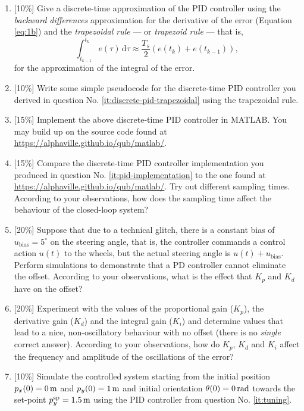 \documentclass[a4paper,10pt,reqno]{amsart}
\numberwithin{equation}{section}
\theoremstyle{plain}
\begin{document}
      \begin{enumerate}
	\item {} \label{it:discrete-pid-trapezoidal}
	      {}[10\%]{} Give a discrete-time approximation of the PID controller using the 
	      \textit{backward differences} approximation for the derivative of the error (Equation \eqref{eq:1b})
	      and the \textit{trapezoidal rule} --- or \textit{trapezoid rule} --- that is, 
	      \[
	      \int_{t_{k-1}}^{t_k} e(\tau)\, {}\mathrm{d}\tau 
	      {}\approx{} 
	      \frac{T_s}{2} \left(e(t_k) + e(t_{k-1})\right),\tag{2}
	      \]
	      for the approximation of the integral of the error.
	\item {}[10\%]{} Write some simple pseudocode for the discrete-time PID controller
	      you derived in question No. \ref{it:discrete-pid-trapezoidal} using the 
	      trapezoidal rule.
	\item {}\label{it:pid-implementation} {}[15\%]{} Implement the above discrete-time PID controller 
	      in MATLAB. You may build up on the source 
	      code found at \href{https://alphaville.github.io/qub/matlab/}{https://alphaville.github.io/qub/matlab/}{.}
	\item {}[15\%]{} Compare the discrete-time PID controller implementation you 
	      produced in question No. \ref{it:pid-implementation}
	      to the one found at \href{https://alphaville.github.io/qub/matlab/}%
	      {https://alphaville.github.io/qub/matlab/}{.}
	      Try out different sampling times.	According to your observations, how does the sampling time
	      affect the behaviour of the closed-loop system?
	\item {}[20\%]{} Suppose that due to a technical glitch, there is a constant bias of $u_{\mathrm{bias}} = 5^\circ$
	      on the steering angle, that is, the controller commands a control action $u(t)$ to the 
	      wheels, but the actual steering angle is $u(t) + u_{\mathrm{bias}}$.
	      Perform simulations to demonstrate that a PD controller cannot eliminate the offset.
	      According to your observations, what is the effect that $K_p$ and $K_d$ have on the offset? 
        \item \label{it:tuning}
	      {}[20\%]{} 
              Experiment with the values of the proportional gain ($K_p$), the derivative gain ($K_d$)
              and the integral gain ($K_i$) and determine values that lead to a nice, non-oscillatory behaviour with no 
              offset (there is no \textit{single} correct answer). According to your observations, 
              how do $K_p$, $K_d$ and $K_i$ affect the frequency and amplitude of the oscillations 
              of the error?
        \item {}[10\%]{} Simulate the controlled system starting from the initial position $p_x(0)=\unit[0]{m}$ and $p_y(0)=\unit[1]{m}$
              and initial orientation $\theta(0) = \unit[0]{rad}$ towards the set-point $p_y^{\mathrm{sp}} = \unit[1.5]{m}$
              using the PID controller from question No. \ref{it:tuning}.
      \end{enumerate}
\end{document}
